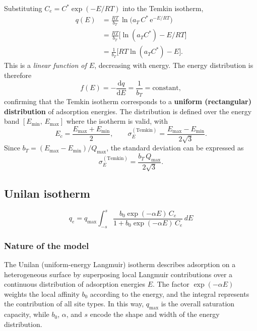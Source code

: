 \documentclass[12pt]{article}
\begin{document}
	Substituting $C_e = C^{\ast}\exp(-E/RT)$ into the Temkin isotherm,
	\begin{align}
		q(E) &= \frac{RT}{b_T}\,
		\ln\!\bigl(a_T\,C^{\ast}\,\mathrm{e}^{-E/RT}\bigr)
		\nonumber\\
		&= \frac{RT}{b_T}
		\bigl[\ln(a_T C^{\ast}) - E/RT\bigr]
		\nonumber\\
		&= \frac{1}{b_T}
		\bigl[RT\ln(a_T C^{\ast}) - E\bigr].
		\label{eq:qE_temkin}
	\end{align}
	This is a \emph{linear function of $E$}, decreasing with energy.
	The energy distribution is therefore
	\begin{equation}
		f(E) = -\frac{\mathrm{d}q}{\mathrm{d}E}
		= \frac{1}{b_T} = \mathrm{constant},
		\label{eq:fE_temkin}
	\end{equation}
	confirming that the Temkin isotherm corresponds to a \textbf{uniform
	(rectangular) distribution} of adsorption energies. The distribution
	is defined over the energy band $[E_{\min},\, E_{\max}]$ where the
	isotherm is valid, with
	\begin{equation}
		E_c = \frac{E_{\max} + E_{\min}}{2},
		\qquad
		\sigma_E^{\mathrm{(Temkin)}}
		= \frac{E_{\max} - E_{\min}}{2\sqrt{3}}.
		\label{eq:sigmaE_temkin}
	\end{equation}
	Since $b_T = (E_{\max} - E_{\min})/Q_{\max}$, the standard deviation
	can be expressed as
	\begin{equation}
		\sigma_E^{\mathrm{(Temkin)}}
		= \frac{b_T\,Q_{\max}}{2\sqrt{3}}.
	\end{equation}

	\subsection{Unilan isotherm}
	\[
	q_e = q_{\max} \int_{-s}^{s} \frac{b_0 \exp(-\alpha E)\, C_e}{1 + b_0 \exp(-\alpha E)\, C_e} \, dE
	\]
	
	\subsubsection{Nature of the model}
	
	The Unilan (uniform-energy Langmuir) isotherm describes adsorption on a
	heterogeneous surface by superposing local Langmuir contributions over a
	continuous distribution of adsorption energies $E$. The factor
	$\exp(-\alpha E)$ weights the local affinity $b_0$ according to the energy,
	and the integral represents the contribution of all site types. In this way,
	$q_{\max}$ is the overall saturation capacity, while $b_0$, $\alpha$, and $s$
	encode the shape and width of the energy distribution.
	
\end{document}
